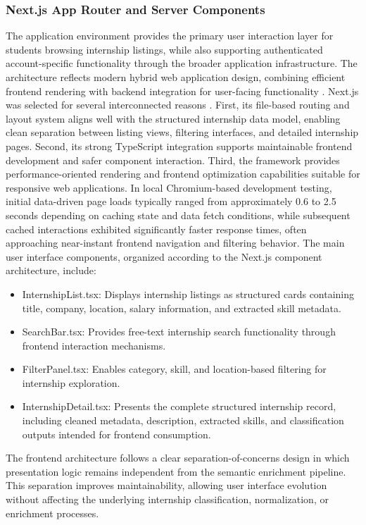 \subsubsection*{Next.js App Router and Server Components}
The application environment provides the primary user interaction layer for students browsing internship listings, while also supporting authenticated account-specific functionality through the broader application infrastructure. The architecture reflects modern hybrid web application design, combining efficient frontend rendering with backend integration for user-facing functionality \cite{riva2022realworld, bass2012software}.
Next.js was selected for several interconnected reasons \cite{riva2022realworld}. First, its file-based routing and layout system aligns well with the structured internship data model, enabling clean separation between listing views, filtering interfaces, and detailed internship pages. Second, its strong TypeScript integration supports maintainable frontend development and safer component interaction. Third, the framework provides performance-oriented rendering and frontend optimization capabilities suitable for responsive web applications.
In local Chromium-based development testing, initial data-driven page loads typically ranged from approximately 0.6 to 2.5 seconds depending on caching state and data fetch conditions, while subsequent cached interactions exhibited significantly faster response times, often approaching near-instant frontend navigation and filtering behavior.
The main user interface components, organized according to the Next.js component architecture, include:
\begin{itemize}
\item InternshipList.tsx: Displays internship listings as structured cards containing title, company, location, salary information, and extracted skill metadata.
\item SearchBar.tsx: Provides free-text internship search functionality through frontend interaction mechanisms.
\item FilterPanel.tsx: Enables category, skill, and location-based filtering for internship exploration.
\item InternshipDetail.tsx: Presents the complete structured internship record, including cleaned metadata, description, extracted skills, and classification outputs intended for frontend consumption.
\end{itemize}
The frontend architecture follows a clear separation-of-concerns design in which presentation logic remains independent from the semantic enrichment pipeline. This separation improves maintainability, allowing user interface evolution without affecting the underlying internship classification, normalization, or enrichment processes.

